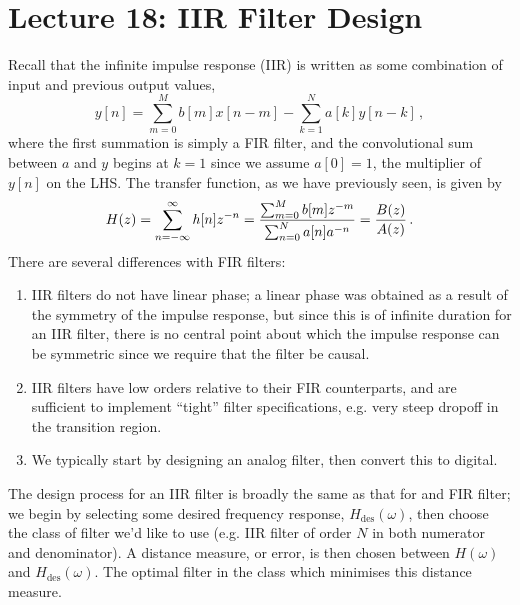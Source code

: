 \section{Lecture 18: IIR Filter Design}
%
Recall that the infinite impulse response (IIR) is written
as some combination of input and previous output values,
%
\begin{displaymath}
  y[n] = \sum_{m=0}^M b[m]x[n-m] - \sum_{k=1}^N a[k]y[n-k] \,,
\end{displaymath}
%
where the first summation is simply a FIR filter, and the convolutional
sum between $a$ and $y$ begins at $k=1$ since we assume $a[0] = 1$,
the multiplier of $y[n]$ on the LHS. The transfer
function, as we have previously seen, is given by
%
\begin{displaymath}
  H(z) = \sum_{n=-\infty}^\infty h[n]z^{-n}
  = \frac{\sum_{m=0}^M b[m]z^{-m}}{\sum_{n=0}^N a[n]a^{-n}}
  = \frac{B(z)}{A(z)} \,.
\end{displaymath}
%
There are several differences with FIR filters:
%
\begin{enumerate}
\item IIR filters do not have linear phase; a linear phase
  was obtained as a result of the symmetry of the impulse response,
  but since this is of infinite duration for an IIR filter, there
  is no central point about which the impulse response can be
  symmetric since we require that the filter be causal.
\item IIR filters have low orders relative to their FIR counterparts,
  and are sufficient to implement ``tight'' filter specifications, e.g.
  very steep dropoff in the transition region.
\item We typically start by designing an analog filter, then convert
  this to digital.
\end{enumerate}
%
The design process for an IIR filter is broadly the same as that for
and FIR filter; we begin by selecting some desired frequency
response, $H_\mathrm{des}(\omega)$, then choose the class of filter we'd like
to use (e.g. IIR filter of order $N$ in both numerator and
denominator). A distance measure, or error, is then chosen between
$H(\omega)$ and $H_\mathrm{des}(\omega)$. The optimal filter in the
class which minimises this distance measure.

